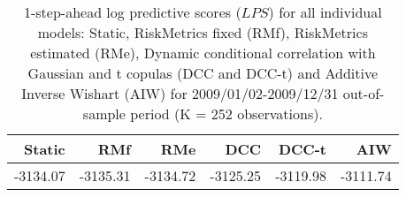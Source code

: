 \begin{table}[ht]
\centering
\caption{1-step-ahead log predictive scores ($LPS$) 
             for all individual models: Static, RiskMetrics fixed (RMf),
RiskMetrics estimated (RMe), 
Dynamic conditional correlation with Gaussian and t copulas (DCC
and DCC-t) and Additive Inverse Wishart (AIW) for 
2009/01/02-2009/12/31 out-of-sample period
(K = 252 observations).} 
\label{table:lps}
\begin{tabular}{rrrrrr}
  \hline
Static & RMf & RMe & DCC & DCC-t & AIW \\ 
  \hline
-3134.07 & -3135.31 & -3134.72 & -3125.25 & -3119.98 & -3111.74 \\ 
   \hline
\end{tabular}
\end{table}
